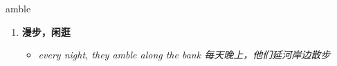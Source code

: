 
\begin{frame}
{\huge amble}
\begin{center}
\begin{enumerate}\Large
  \item \textbf{漫步，闲逛}
  \begin{itemize}
    \item \em{\Large{every night, they amble along the bank 每天晚上，他们延河岸边散步}}
  \end{itemize}
\end{enumerate}
\end{center}
\end{frame}
